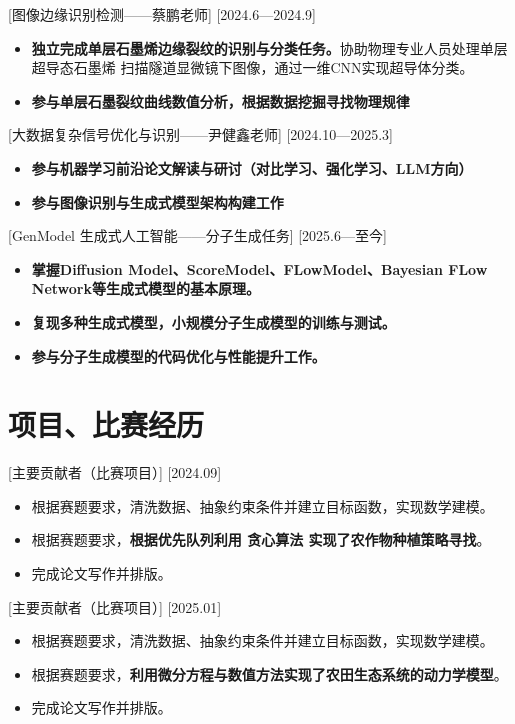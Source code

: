 \documentclass{resume}
\begin{document}
[图像边缘识别检测——蔡鹏老师]
[2024.6—2024.9] 

\begin{itemize}
  \item \textbf{独立完成单层石墨烯边缘裂纹的识别与分类任务。}协助物理专业人员处理单层超导态石墨烯
  扫描隧道显微镜下图像，通过一维CNN实现超导体分类。
  \item \textbf{参与单层石墨裂纹曲线数值分析，根据数据挖掘寻找物理规律}
\end{itemize}

[大数据复杂信号优化与识别——尹健鑫老师]
[2024.10—2025.3] 
\begin{itemize}
  \item \textbf{参与机器学习前沿论文解读与研讨（对比学习、强化学习、LLM方向）}
  \item \textbf{参与图像识别与生成式模型架构构建工作}
\end{itemize}

[GenModel 生成式人工智能——分子生成任务]
[2025.6—至今]
\begin{itemize}
  \item \textbf{掌握Diffusion Model、ScoreModel、FLowModel、Bayesian FLow Network等生成式模型的基本原理。}
  \item \textbf{复现多种生成式模型，小规模分子生成模型的训练与测试。}
  \item \textbf{参与分子生成模型的代码优化与性能提升工作。}
\end{itemize}


\section{项目、比赛经历}

[主要贡献者（比赛项目）]
[2024.09]

\begin{itemize}
  \item 根据赛题要求，清洗数据、抽象约束条件并建立目标函数，实现数学建模。
  \item 根据赛题要求，\textbf{根据优先队列利用 贪心算法 实现了农作物种植策略寻找}。
  \item 完成论文写作并排版。
\end{itemize}

[主要贡献者（比赛项目）]
[2025.01]
\begin{itemize}
  \item 根据赛题要求，清洗数据、抽象约束条件并建立目标函数，实现数学建模。
  \item 根据赛题要求，\textbf{利用微分方程与数值方法实现了农田生态系统的动力学模型}。
  \item 完成论文写作并排版。
\end{itemize}
\end{document}
